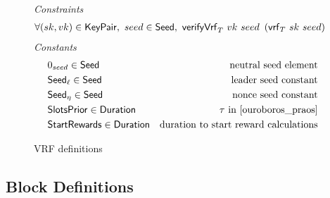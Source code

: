 \begin{figure}[htb]
  \emph{Constraints}
  \begin{align*}
    & \forall (sk, vk) \in \mathsf{KeyPair},~ seed \in \mathsf{Seed},~
    \mathsf{verifyVrf}_{T} ~ vk ~ seed ~\left(\mathsf{vrf}_{T} ~ sk ~ seed\right)
  \end{align*}
  \emph{Constants}
  \begin{align*}
    & 0_{seed} \in \mathsf{Seed} & \text{neutral seed element} \\
    & \mathsf{Seed}_\ell \in \mathsf{Seed} & \text{leader seed constant} \\
    & \mathsf{Seed}_\eta \in \mathsf{Seed} & \text{nonce seed constant}\\
    & \mathsf{SlotsPrior} \in \mathsf{Duration} & \tau\text{ in \cite{ouroboros_praos}}\\
    & \mathsf{StartRewards} \in \mathsf{Duration} & \text{duration to start reward calculations}\\
  \end{align*}

  \caption{VRF definitions}
  \label{fig:defs-vrf}
\end{figure}

\clearpage

\subsection{Block Definitions}
\label{sec:defs-blocks}

